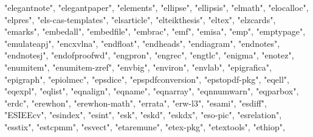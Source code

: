 \documentclass[
]{article}
\newenvironment{Shaded}{\begin{snugshade}}{\end{snugshade}}
\newcommand{\NormalTok}[1]{#1}
\newcommand{\StringTok}[1]{\textcolor[rgb]{0.31,0.60,0.02}{#1}}
\begin{document}
\begin{Shaded}
\begin{Highlighting}[]
\StringTok{"elegantnote"}\NormalTok{, }\StringTok{"elegantpaper"}\NormalTok{, }\StringTok{"elements"}\NormalTok{, }\StringTok{"ellipse"}\NormalTok{, }\StringTok{"ellipsis"}\NormalTok{, }
\StringTok{"elmath"}\NormalTok{, }\StringTok{"elocalloc"}\NormalTok{, }\StringTok{"elpres"}\NormalTok{, }\StringTok{"els{-}cas{-}templates"}\NormalTok{, }\StringTok{"elsarticle"}\NormalTok{, }
\StringTok{"elteikthesis"}\NormalTok{, }\StringTok{"eltex"}\NormalTok{, }\StringTok{"elzcards"}\NormalTok{, }\StringTok{"emarks"}\NormalTok{, }\StringTok{"embedall"}\NormalTok{, }\StringTok{"embedfile"}\NormalTok{, }
\StringTok{"embrac"}\NormalTok{, }\StringTok{"emf"}\NormalTok{, }\StringTok{"emisa"}\NormalTok{, }\StringTok{"emp"}\NormalTok{, }\StringTok{"emptypage"}\NormalTok{, }\StringTok{"emulateapj"}\NormalTok{, }\StringTok{"encxvlna"}\NormalTok{, }
\StringTok{"endfloat"}\NormalTok{, }\StringTok{"endheads"}\NormalTok{, }\StringTok{"endiagram"}\NormalTok{, }\StringTok{"endnotes"}\NormalTok{, }\StringTok{"endnotesj"}\NormalTok{, }
\StringTok{"endofproofwd"}\NormalTok{, }\StringTok{"engpron"}\NormalTok{, }\StringTok{"engrec"}\NormalTok{, }\StringTok{"engtlc"}\NormalTok{, }\StringTok{"enigma"}\NormalTok{, }\StringTok{"enotez"}\NormalTok{, }
\StringTok{"enumitem"}\NormalTok{, }\StringTok{"enumitem{-}zref"}\NormalTok{, }\StringTok{"envbig"}\NormalTok{, }\StringTok{"environ"}\NormalTok{, }\StringTok{"envlab"}\NormalTok{, }\StringTok{"epigrafica"}\NormalTok{, }
\StringTok{"epigraph"}\NormalTok{, }\StringTok{"epiolmec"}\NormalTok{, }\StringTok{"epsdice"}\NormalTok{, }\StringTok{"epspdfconversion"}\NormalTok{, }\StringTok{"epstopdf{-}pkg"}\NormalTok{, }
\StringTok{"eqell"}\NormalTok{, }\StringTok{"eqexpl"}\NormalTok{, }\StringTok{"eqlist"}\NormalTok{, }\StringTok{"eqnalign"}\NormalTok{, }\StringTok{"eqname"}\NormalTok{, }\StringTok{"eqnarray"}\NormalTok{, }
\StringTok{"eqnnumwarn"}\NormalTok{, }\StringTok{"eqparbox"}\NormalTok{, }\StringTok{"erdc"}\NormalTok{, }\StringTok{"erewhon"}\NormalTok{, }\StringTok{"erewhon{-}math"}\NormalTok{, }
\StringTok{"errata"}\NormalTok{, }\StringTok{"erw{-}l3"}\NormalTok{, }\StringTok{"esami"}\NormalTok{, }\StringTok{"esdiff"}\NormalTok{, }\StringTok{"ESIEEcv"}\NormalTok{, }\StringTok{"esindex"}\NormalTok{, }
\StringTok{"esint"}\NormalTok{, }\StringTok{"esk"}\NormalTok{, }\StringTok{"eskd"}\NormalTok{, }\StringTok{"eskdx"}\NormalTok{, }\StringTok{"eso{-}pic"}\NormalTok{, }\StringTok{"esrelation"}\NormalTok{, }\StringTok{"esstix"}\NormalTok{, }
\StringTok{"estcpmm"}\NormalTok{, }\StringTok{"esvect"}\NormalTok{, }\StringTok{"etaremune"}\NormalTok{, }\StringTok{"etex{-}pkg"}\NormalTok{, }\StringTok{"etextools"}\NormalTok{, }\StringTok{"ethiop"}\NormalTok{, }

\end{Highlighting}
\end{Shaded}
\end{document}
